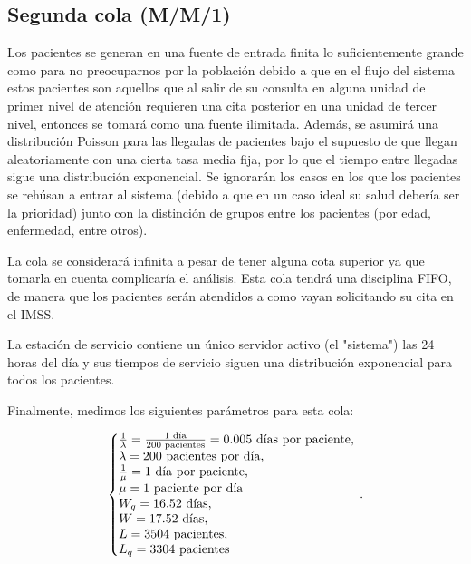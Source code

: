 \documentclass[10pt]{article}
\begin{document}
    \subsection{Segunda cola (M/M/1)}
    Los pacientes se generan en una fuente de entrada finita lo suficientemente grande como para no preocuparnos por la población debido a que en el flujo del sistema estos pacientes son aquellos que al salir de su consulta en alguna unidad de primer nivel de atención requieren una cita posterior en una unidad de tercer nivel, entonces se tomará como una fuente ilimitada. Además, se asumirá una distribución Poisson para las llegadas de pacientes bajo el supuesto de que llegan aleatoriamente con una cierta tasa media fija, por lo que el tiempo entre llegadas sigue una distribución exponencial. Se ignorarán los casos en los que los pacientes se rehúsan a entrar al sistema (debido a que en un caso ideal su salud debería ser la prioridad) junto con la distinción de grupos entre los pacientes (por edad, enfermedad, entre otros). \par
    La cola se considerará infinita a pesar de tener alguna cota superior ya que tomarla en cuenta complicaría el análisis. Esta cola tendrá una disciplina FIFO, de manera que los pacientes serán atendidos a como vayan solicitando su cita en el IMSS. \par
    La estación de servicio contiene un único servidor activo (el "sistema") las 24 horas del día y sus tiempos de servicio siguen una distribución exponencial para todos los pacientes. \par
    Finalmente, medimos los siguientes parámetros para esta cola:
    
    \newpage
    
    \begin{equation*}
    	\left\{
    	\begin{array}{@{}l@{}}
    		\frac{1}{\lambda} = \frac{1 \text{ día}}{200 \text{ pacientes}} = 0.005 \text{ días por paciente,} \\
    		\lambda = 200 \text{ pacientes por día,} \\
    		\frac{1}{\mu} = 1 \text{ día por paciente,} \\
    		\mu = 1 \text{ paciente por día} \\
    		W_{q} = 16.52 \text{ días,} \\
    		W = 17.52 \text{ días,} \\
    		L = 3504 \text{ pacientes,} \\
    		L_{q} = 3304 \text{ pacientes}
    	\end{array}
    	\right.\,.
    \end{equation*}
    
\end{document}
